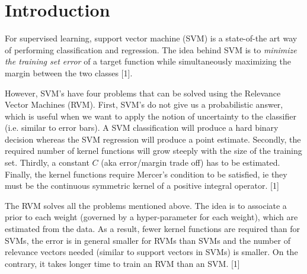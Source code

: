\section{Introduction}
For supervised learning, support vector machine (SVM) is a state-of-the art way of performing classification and regression. The idea behind SVM is to \textit{minimize the training set error} of a target function while simultaneously maximizing the margin between the two classes [1].

However, SVM's have four problems that can be solved using the Relevance Vector Machines (RVM). First, SVM's do not give us a probabilistic answer, which is useful when we want to apply the notion of uncertainty to the classifier (i.e. similar to error bars). A SVM classification will produce a hard binary decision whereas the SVM regression will produce a point estimate. Secondly, the required number of kernel functions will grow steeply with the size of the training set. Thirdly, a constant $C$ (aka error/margin trade off) has to be estimated. Finally, the kernel functions require Mercer's condition to be satisfied, ie they must be the continuous symmetric kernel of a positive integral operator. [1]

The RVM solves all the problems mentioned above. The idea is to associate a prior to each weight (governed by a hyper-parameter for each weight), which are estimated from the data. As a result, fewer kernel functions are required than for SVMs, the error is in general smaller for RVMs than SVMs and the number of relevance vectors needed (similar to support vectors in SVMs) is smaller. On the contrary, it takes longer time to train an RVM than an SVM. [1]
